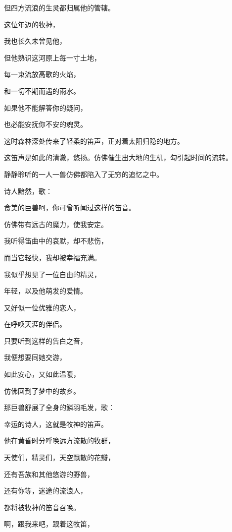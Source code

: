 \documentclass[UTF8]{article}
\begin{document}
\par 但四方流浪的生灵都归属他的管辖。
\par 这位年迈的牧神，
\par 我也长久未曾见他，
\par 但他熟识这河原上每一寸土地，
\par 每一束流放高歌的火焰，
\par 和一切不期而遇的雨水。
\par 如果他不能解答你的疑问，
\par 也必能安抚你不安的魂灵。
\\[0.6cm]
\par 这时森林深处传来了轻柔的笛声，正对着太阳归隐的地方。
\par 这笛声是如此的清澈，悠扬。仿佛催生出大地的生机，勾引起时间的流转。
\par 静静聆听的一人一兽仿佛都陷入了无穷的追忆之中。
\\[0.6cm]
\par 诗人黯然，歌：
\\[0.6cm]
\par 食美的巨兽呵，你可曾听闻过这样的笛音。
\par 仿佛带有远古的魔力，使我安定。
\par 我听得笛曲中的哀默，却不悲伤，
\par 而当它轻快，我却被幸福充满。
\par 我似乎想见了一位自由的精灵，
\par 年轻，以及他萌发的爱情。
\par 又好似一位优雅的恋人，
\par 在呼唤天涯的伴侣。
\par 只要听到这样的告白之音，
\par 我便想要同她交游，
\par 如此安心，又如此温暖，
\par 仿佛回到了梦中的故乡。
\\[0.6cm]
\par 那巨兽舒展了全身的鳞羽毛发，歌：
\\[0.6cm]
\par 幸运的诗人，这就是牧神的笛声。
\par 他在黄昏时分呼唤远方流散的牧群，
\par 天使们，精灵们，天空飘散的花瓣，
\par 还有吾族和其他悠游的野兽，
\par 还有你等，迷途的流浪人，
\par 都将被牧神的笛音召唤。
\par 啊，跟我来吧，跟着这牧笛，
\end{document}
